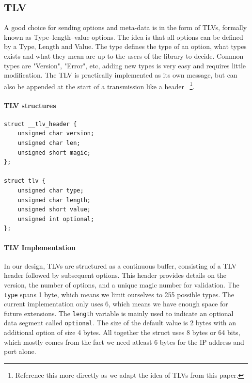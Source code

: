 \documentclass[a4paper,english, 11pt]{report}
\begin{document}
\subsection{TLV}
A good choice for sending options and meta-data is in the form of TLVs, formally known as Type–length–value options.
The idea is that all options can be defined by a Type, Length and Value. The type defines the type of an option, what types exists and what they mean are up to the users of the library to decide. Common types are "Version", "Error", etc, adding new types is very easy and requires little modification. The TLV is practically implemented as its own message, but can also be appended at the start of a transmission like a header ~\cite{rfc8803}\footnote{Reference this more directly as we adapt the idea of TLVs from this paper.}.\\

\noindent\begin{minipage}{\linewidth}
\paragraph{TLV structures}
\begin{verbatim}
struct __tlv_header {
    unsigned char version;
    unsigned char len;
    unsigned short magic;
};

struct tlv {
    unsigned char type;
    unsigned char length;
    unsigned short value;
    unsigned int optional;
};
\end{verbatim}
\end{minipage}

\paragraph{TLV Implementation}
In our design, TLVs are structured as a continuous buffer, consisting of a TLV header followed by subsequent options.  This header provides details on the version, the number of options, and a unique magic number for validation. The \verb|type| spans 1 byte, which means we limit ourselves to 255 possible types. The current implementation only uses 6, which means we have enough space for future extensions. The \verb|length| variable is mainly used to indicate an optional data segment called \verb|optional|. The size of the default value is 2 bytes with an additional option of size 4 bytes. All together the struct uses 8 bytes or 64 bits, which mostly comes from the fact we need atleast 6 bytes for the IP address and port alone. 
\end{document}
